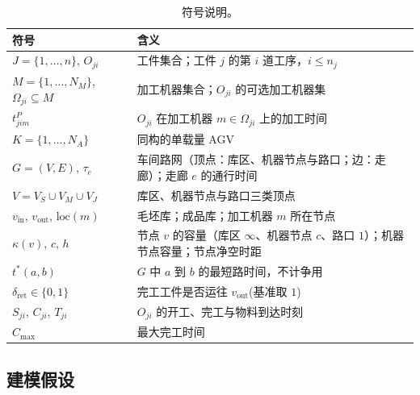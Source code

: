 \documentclass[manuscript,screen,review]{acmart}
\begin{document}
\begin{table}[t]
\caption{符号说明。}
\label{tab:notation}
\small
\begin{tabular}{@{}ll@{}}
\toprule
符号 & 含义 \\
\midrule
$J=\{1,\dots,n\}$, $O_{ji}$ & 工件集合；工件 $j$ 的第 $i$ 道工序，$i\le n_j$ \\
$M=\{1,\dots,N_M\}$, $\Omega_{ji}\subseteq M$ & 加工机器集合；$O_{ji}$ 的可选加工机器集 \\
$t^P_{jim}$ & $O_{ji}$ 在加工机器 $m\in\Omega_{ji}$ 上的加工时间 \\
$K=\{1,\dots,N_A\}$ & 同构的单载量 AGV \\
$G=(V,E)$, $\tau_e$ & 车间路网（顶点：库区、机器节点与路口；边：走廊）；走廊 $e$ 的通行时间 \\
$V=V_S\cup V_M\cup V_J$ & 库区、机器节点与路口三类顶点 \\
$v_{\mathrm{in}}$, $v_{\mathrm{out}}$, $\mathrm{loc}(m)$ & 毛坯库；成品库；加工机器 $m$ 所在节点 \\
$\kappa(v)$, $c$, $h$ & 节点 $v$ 的容量（库区 $\infty$、机器节点 $c$、路口 $1$）；机器节点容量；节点净空时距 \\
$t^{*}(a,b)$ & $G$ 中 $a$ 到 $b$ 的最短路时间，不计争用 \\
$\delta_{\mathrm{ret}}\in\{0,1\}$ & 完工工件是否运往 $v_{\mathrm{out}}$(基准取 $1$) \\
$S_{ji}$, $C_{ji}$, $T_{ji}$ & $O_{ji}$ 的开工、完工与物料到达时刻 \\
$C_{\max}$ & 最大完工时间 \\
\bottomrule
\end{tabular}
\end{table}

\subsection{建模假设}
\label{sec:assumptions}
\end{document}
